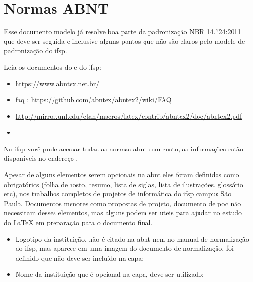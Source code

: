 \section{Normas ABNT}

Esse documento modelo já resolve boa parte da padronização NBR 14.724:2011 \cite{NBR14724:2011} que deve ser seguida e inclusive alguns pontos que não são claros pelo modelo de padronização do \ac{ifsp}.

Leia os documentos do {\abnTeX} e do \ac{ifsp}:
\begin{itemize}
    \item \url{https://www.abntex.net.br/}
    
    \item \acs{faq} : \url{https://github.com/abntex/abntex2/wiki/FAQ}
    
    \item \url{http://mirror.unl.edu/ctan/macros/latex/contrib/abntex2/doc/abntex2.pdf}
    
    \item {}
\end{itemize}

No \ac{ifsp} você pode acessar todas as normas \ac{abnt} sem custo, as informações estão disponíveis no endereço .

Apesar de alguns elementos serem opcionais na \ac{abnt} eles foram definidos como obrigatórios (folha de rosto, resumo, lista de siglas, lista de ilustrações, glossário etc), nos trabalhos completos de projetos de informática do \ac{ifsp} campus São Paulo. Documentos menores como propostas de projeto, documento de \ac{poc} não necessitam desses elementos, mas alguns podem ser uteis para ajudar no estudo do {\LaTeX} em preparação para o documento final.

\begin{itemize}
    \item Logotipo da instituição, não é citado na \ac{abnt} nem no manual de normalização do \ac{ifsp}, mas aparece em uma imagem do documento de normalização, foi definido que não deve ser incluído na capa;
    
    \item Nome da instituição que é opcional na capa, deve ser utilizado;
    
\end{itemize}

